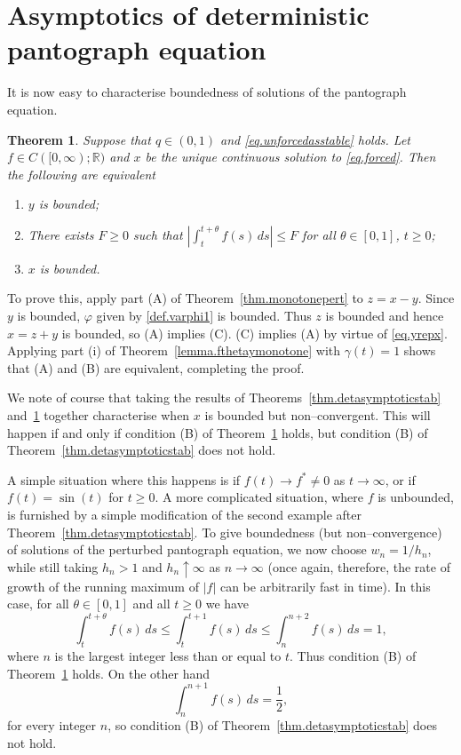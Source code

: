 \documentclass[a4paper,10pt,reqno]{amsart}
\numberwithin{equation}{section}
\newtheorem{theorem}{Theorem}
\theoremstyle{definition}
\theoremstyle{remark}
\DeclareMathOperator{\1}{\mathbbm 1}
\begin{document}
\section{Asymptotics of deterministic pantograph equation}
It is now easy to characterise boundedness of solutions of the pantograph equation. 
\begin{theorem}\label{thm.detasymptoticbound}
	Suppose that $q\in (0,1)$ and \eqref{eq.unforcedasstable} holds. Let $f\in C([0,\infty);\mathbb{R})$ and $x$ be the unique continuous solution to  \eqref{eq.forced}. Then the following are equivalent
	\begin{enumerate}
		\item[(A)] $y$ is bounded;
		\item[(B)] There exists $F\geq 0$ such that $|\int_t^{t+\theta} f(s)\,ds|\leq F$ for all $\theta\in [0,1]$, $t\geq 0$;
		\item[(C)] $x$ is bounded. 
	\end{enumerate}
\end{theorem}
To prove this, apply part (A) of Theorem~\ref{thm.monotonepert} to $z=x-y$. Since $y$ is bounded, $\varphi$ given by \eqref{def.varphi1} is bounded. Thus $z$ is bounded and hence  $x=z+y$ is bounded, so (A) implies (C). (C) implies (A) by virtue of \eqref{eq.yrepx}. Applying part (i) of Theorem~\ref{lemma.fthetaymonotone} with $\gamma(t)=1$ shows that (A) and (B) are equivalent, completing the proof. 

We note of course that taking the results of Theorems~\ref{thm.detasymptoticstab} and~\ref{thm.detasymptoticbound} together characterise when $x$ is bounded but non--convergent. This will happen if and only if condition (B) of Theorem~\ref{thm.detasymptoticbound} holds, but condition (B) of Theorem~\ref{thm.detasymptoticstab} does not hold. 

A simple situation where this happens is if $f(t)\to f^\ast\neq 0$ as $t\to\infty$, or if $f(t)=\sin(t)$ for $t\geq 0$. A more complicated situation, where $f$ is unbounded, is furnished by a simple modification of the second example after Theorem~\ref{thm.detasymptoticstab}. To give boundedness (but non--convergence) of solutions of the perturbed pantograph equation, we now choose $w_n=1/h_n$, while still taking $h_n>1$ and $h_n\uparrow \infty$ as $n\to\infty$ (once again, therefore, the rate of growth of the running maximum of $|f|$ can be arbitrarily fast in time). In this case, for all $\theta\in [0,1]$ and all $t\geq 0$ we have  
\[
\int_{t}^{t+\theta} f(s)\,ds \leq \int_{t}^{t+1} f(s)\,ds \leq \int_{n}^{n+2} f(s)\,ds = 1,
\]   
where $n$ is the largest integer less than or equal to $t$. Thus condition (B) of Theorem~\ref{thm.detasymptoticbound} holds. On the other hand
\[
\int_{n}^{n+1} f(s)\,ds = \frac{1}{2},
\]
for every integer $n$, so condition (B) of Theorem~\ref{thm.detasymptoticstab} does not hold.
\end{document}
